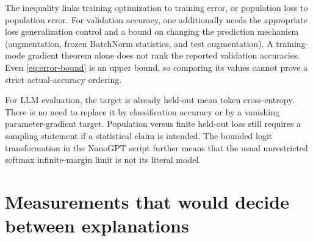\documentclass[11pt]{article}
\begin{document}
The inequality links training optimization to training error, or population
loss to population error. For validation accuracy, one additionally needs
the appropriate loss generalization control and a bound on changing the
prediction mechanism (augmentation, frozen BatchNorm statistics, and test
augmentation). A training-mode gradient theorem alone does not rank the
reported validation accuracies. Even \eqref{eq:error-bound} is an upper
bound, so comparing its values cannot prove a strict actual-accuracy ordering.

For LLM evaluation, the target is already held-out mean token cross-entropy.
There is no need to replace it by classification accuracy or by a vanishing
parameter-gradient target. Population versus finite held-out loss still
requires a sampling statement if a statistical claim is intended. The
bounded logit transformation in the NanoGPT script further means that the
usual unrestricted softmax infinite-margin limit is not its literal model.

\section{Measurements that would decide between explanations}
\end{document}
